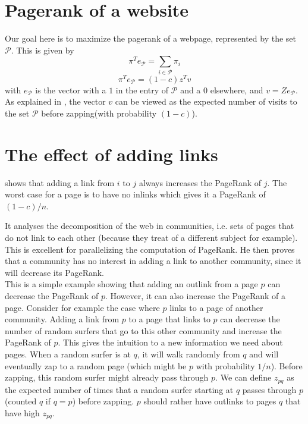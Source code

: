 \documentclass{article}
\newcommand{\1}{\mathbf{1}}
\theoremstyle{definition}
\begin{document}
\section{Pagerank of a website}
Our goal here is to maximize the pagerank of a webpage, represented by the set $\mathcal{P}$. This is given by
$$\pi^Te_{\mathcal{P}} = \sum_{i\in \mathcal{P}}\pi_i$$
$$\pi^Te_{\mathcal{P}} = (1-c)z^Tv$$
with $e_{\mathcal{P}}$ is the vector with a $1$ in the entry of $\mathcal{P}$ and a $0$ elsewhere, and $v = Ze_{\mathcal{P}}$.\\
As explained in \cite{de2008maximizing}, the vector $v$ can be viewed as the expected number of visits to the set $\mathcal{P}$ before zapping(with probability $(1-c)$).

\section{The effect of adding links}
\cite{avrachenkov2004decomposition} shows that adding a link
from $i$ to $j$ always increases the PageRank of $j$.
The worst case for a page is to have no inlinks which gives it a PageRank of $(1-c)/n$.

It analyses the decomposition of the web in communities, i.e.
sets of pages that do not link to each other (because they treat of a different subject for example).
This is excellent for parallelizing the computation of PageRank.
He then proves that a community has no interest in adding a link to another community, since it will decrease its PageRank.\\

This is a simple example showing that adding an outlink from a page $p$ can decrease the PageRank of $p$.
However, it can also increase the PageRank of a page.
Consider for example the case where $p$ links to a page of another community.
Adding a link from $p$ to a page that links to $p$ can decrease the number of random surfers that go to this other community and increase the PageRank of $p$.
This gives the intuition to a new information we need about pages.
When a random surfer is at $q$, it will walk randomly from $q$ and will eventually zap to a random page (which might be $p$ with probability $1/n$).
Before zapping, this random surfer might already pass through $p$.
We can define $z_{pq}$ as the expected number of times that a random surfer starting at $q$ passes through $p$ (counted $q$ if $q=p$) before zapping.
$p$ should rather have outlinks to pages $q$ that have high $z_{pq}$.
\end{document}
